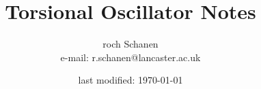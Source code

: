 \documentclass[a5paper, 10pt]{article}
\begin{document}
	\title{Torsional Oscillator Notes}

	\author{roch Schanen \\ e-mail: r.schanen@lancaster.ac.uk}

	\date{last modified: \today}

	\maketitle

	\tableofcontents

	\newpage



\end{document}
